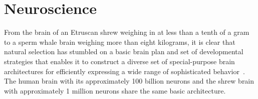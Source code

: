 

\section{Neuroscience}
\label{section_neuroscience}


  

From the brain of an Etruscan shrew weighing in at less than a tenth of a gram to a sperm whale brain weighing more than eight kilograms, it is clear that natural selection has stumbled on a basic brain plan and set of developmental strategies that enables it to construct a diverse set of special-purpose brain architectures for efficiently expressing a wide range of sophisticated behavior~\cite{DouglasandMartinCURRENT-BIOLOGY-12,WillemetBRAIN-SCIENCE-12}. The human brain with its approximately 100 billion neurons and the shrew brain with approximately 1 million neurons share the same basic architecture.

